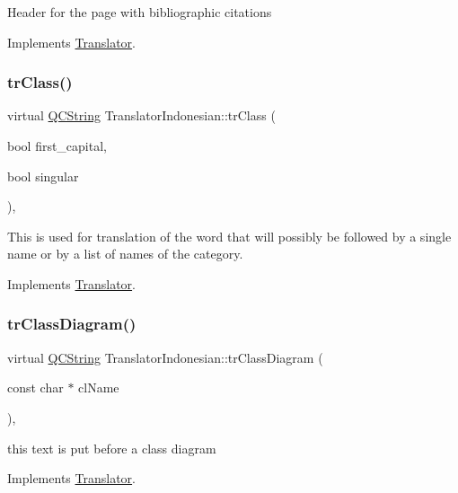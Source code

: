 Header for the page with bibliographic citations 

Implements \mbox{\hyperlink{class_translator}{Translator}}.

\mbox{\label{class_translator_indonesian_a8b7bf8809a07a9e83e95c9437f772946}} 
\subsubsection{\texorpdfstring{trClass()}{trClass()}}
{\footnotesize\ttfamily virtual \mbox{\hyperlink{class_q_c_string}{Q\+C\+String}} Translator\+Indonesian\+::tr\+Class (\begin{DoxyParamCaption}\item[{bool}]{first\+\_\+capital,  }\item[{bool}]{singular }\end{DoxyParamCaption})\hspace{0.3cm}{\ttfamily [inline]}, {\ttfamily [virtual]}}

This is used for translation of the word that will possibly be followed by a single name or by a list of names of the category. 

Implements \mbox{\hyperlink{class_translator}{Translator}}.

\mbox{\label{class_translator_indonesian_a032fa551088d27ada750c9785bf5f12f}} 
\subsubsection{\texorpdfstring{trClassDiagram()}{trClassDiagram()}}
{\footnotesize\ttfamily virtual \mbox{\hyperlink{class_q_c_string}{Q\+C\+String}} Translator\+Indonesian\+::tr\+Class\+Diagram (\begin{DoxyParamCaption}\item[{const char $\ast$}]{cl\+Name }\end{DoxyParamCaption})\hspace{0.3cm}{\ttfamily [inline]}, {\ttfamily [virtual]}}

this text is put before a class diagram 

Implements \mbox{\hyperlink{class_translator}{Translator}}.

